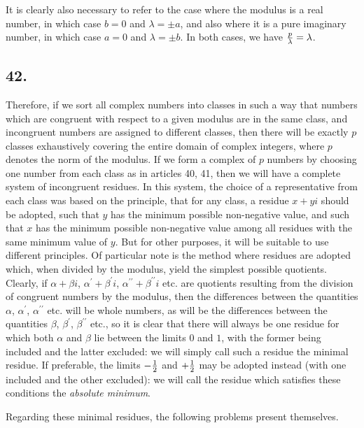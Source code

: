 \documentclass[twoside,12pt]{memoir}
\let\oldfrac\frac
\def\frac#1#2{\mathchoice{\tfrac{#1}{#2}}{\oldfrac{#1}{#2}}{\genfrac{}{}{}{2}{#1}{#2\mathstrut}}{\genfrac{}{}{}{3}{#1}{#2\mathstrut}}}
\begin{document}
It is clearly also necessary to refer to the case where the modulus is a real number, in which case \(b=0\) and \(\lambda= \pm a\), and also where it is a pure imaginary number, in which case \(a=0\) and \(\lambda= \pm b\). In both cases, we have \(\frac{p}{\lambda}=\lambda\).\pagebreak%

\subsection*{42.}

Therefore, if we sort all complex numbers into classes in such a way that numbers which are congruent with respect to a given modulus are in the same class, and incongruent numbers are assigned to different classes, then there will be exactly \(p\) classes exhaustively covering the entire domain of complex integers, where \(p\) denotes the norm of the modulus. If we form a complex of \(p\) numbers by choosing one number from each class as in articles 40, 41, then we will have a complete system of incongruent residues. In this system, the choice of a representative from each class was based on the principle, that for any class, a residue \(x+yi\) should be adopted, such that \(y\) has the minimum possible non-negative value, and such that \(x\) has the minimum possible non-negative value among all residues with the same minimum value of \(y\). But for other purposes, it will be suitable to use different principles. Of particular note is the method where residues are adopted which, when divided by the modulus, yield the simplest possible quotients. Clearly, if \(\alpha+\beta i\), \(\alpha^{\prime}+\beta^{\prime} i\), \(\alpha^{\prime \prime}+\beta^{\prime \prime} i\) etc{.} are quotients resulting from the division of congruent numbers by the modulus, then the differences between the quantities \(\alpha\), \(\alpha^{\prime}\), \(\alpha^{\prime \prime}\) etc{.} will be whole numbers, as will be the differences between the quantities \(\beta\), \(\beta^{\prime}\), \(\beta^{\prime \prime}\) etc{.}, so it is clear that there will always be one residue for which both \(\alpha\) and \(\beta\) lie between the limits \(0\) and \(1\), with the former being included and the latter excluded: we will simply call such a residue the minimal residue. If preferable, the limits \(-\frac{1}{2} \) and \(+\frac{1}{2} \) may be adopted instead (with one included and the other excluded): we will call the residue which satisfies these conditions the \textit{absolute minimum}.

Regarding these minimal residues, the following problems present themselves.
\end{document}
